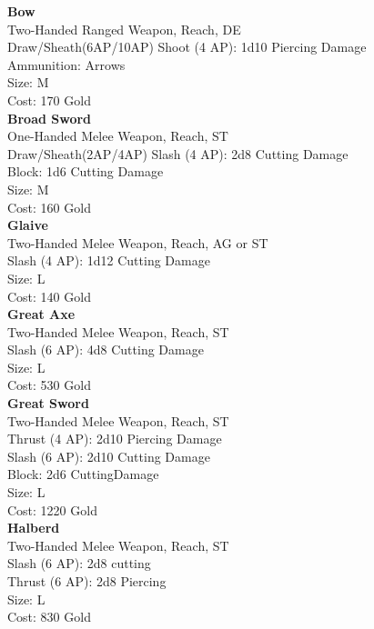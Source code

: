\textbf{Bow}\label{weapon:bow}\\
Two-Handed Ranged Weapon,  Reach, DE\\
Draw/Sheath(6AP/10AP)
Shoot (4 AP): 1d10 Piercing Damage\\
Ammunition: Arrows\\
Size: M\\
Cost: 170 Gold\\

\textbf{Broad Sword}\label{weapon:broadSword}\\
One-Handed Melee Weapon,  Reach, ST\\
Draw/Sheath(2AP/4AP)
Slash (4 AP): 2d8 Cutting Damage\\
Block: 1d6 Cutting Damage\\
Size: M\\
Cost: 160 Gold\\

\textbf{Glaive}\label{weapon:glaive}\\
Two-Handed Melee Weapon,  Reach, AG or ST\\
Slash (4 AP): 1d12 Cutting Damage\\
Size: L\\
Cost: 140 Gold\\

\textbf{Great Axe}\label{weapon:greatAxe}\\
Two-Handed Melee Weapon,  Reach, ST\\
Slash (6 AP): 4d8 Cutting Damage\\
Size: L\\
Cost: 530 Gold\\

\textbf{Great Sword}\label{weapon:greatSword}\\
Two-Handed Melee Weapon,  Reach, ST\\
Thrust (4 AP): 2d10 Piercing Damage\\
Slash (6 AP): 2d10 Cutting Damage\\
Block: 2d6 CuttingDamage\\
Size: L\\
Cost: 1220 Gold\\

\textbf{Halberd}\label{weapon:halberd}\\
Two-Handed Melee Weapon,  Reach, ST\\
Slash (6 AP): 2d8 cutting\\
Thrust (6 AP): 2d8 Piercing\\
Size: L\\
Cost: 830 Gold\\

